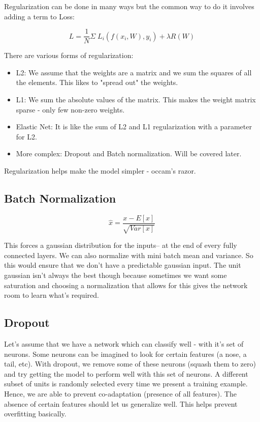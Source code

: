 Regularization can be done in many ways but the common way to do it involves adding a term to Loss:

\begin{equation}
    L = \frac{1}{N} \Sigma \;  L_i (f(x_i, W), y_i) + \lambda R(W)
\end{equation}

There are various forms of regularization:

\begin{itemize}
    \item L2: We assume that the weights are a matrix and we sum the squares of all the elements. This likes to "spread out" the weights.
    \item L1: We sum the absolute values of the matrix. This makes the weight matrix sparse - only few non-zero weights.
    \item Elastic Net: It is like the sum of L2 and L1 regularization with a parameter for L2.
    \item More complex: Dropout and Batch normalization. Will be covered later.
\end{itemize}

Regularization helps make the model simpler - occam's razor. 

\subsection{Batch Normalization}

\begin{equation}
    \hat{x} = \frac{x-E[x]}{\sqrt{Var[x]}}
\end{equation}

This forces a gaussian distribution for the inputs-- at the end of every fully connected layers. We can also normalize with mini batch mean and variance. So this would ensure that we don't have a predictable gaussian input. The unit gaussian isn't always the best though because sometimes we want some saturation and choosing a normalization that allows for this gives the network room to learn what's required. 

\subsection{Dropout}

Let's assume that we have a network which can classify well - with it's set of neurons. Some neurons can be imagined to look for certain features (a nose, a tail, etc). With dropout, we remove some of these neurons (squash them to zero) and try getting the model to perform well with this set of neurons. A different subset of units is randomly selected every time we present a training example. Hence, we are able to prevent co-adaptation (presence of all features). The absence of certain features should let us generalize well. This helps prevent overfitting basically.

